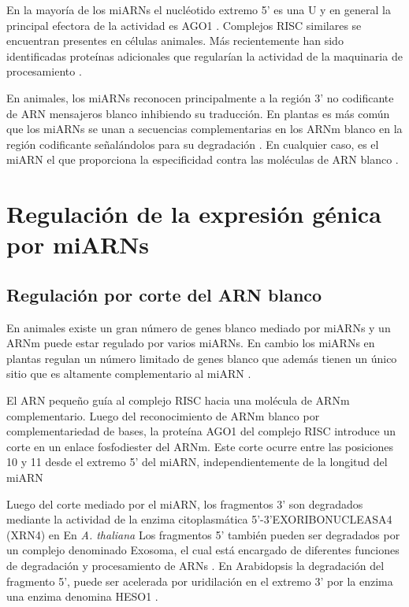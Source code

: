 En la mayoría de los miARNs el nucléotido extremo 5' es una U y en general la principal efectora de la actividad es AGO1 \citep{Voinnet2009669,pmid18342361,Vazquez2004a}.
Complejos RISC similares se encuentran presentes en células animales.
Más recientemente han sido identificadas proteínas adicionales que regularían la actividad de la maquinaria de procesamiento \citep{Bologna11112012}.

En animales, los miARNs reconocen principalmente a la región 3’ no codificante de ARN mensajeros blanco inhibiendo su traducción.
En plantas es más común que los miARNs se unan a secuencias complementarias en los ARNm blanco en la región codificante señalándolos para su degradación \citep{Jones-Rhoades2006}.
En cualquier caso, es el miARN el que proporciona la especificidad contra las moléculas de ARN blanco \citep{Bartel2004}.

\section{Regulación de la expresión génica por miARNs}

\subsection{Regulación por corte del ARN blanco}

En animales existe un gran número de genes blanco mediado por miARNs y un ARNm puede estar regulado por varios miARNs.
En cambio los miARNs en plantas regulan un número limitado de genes blanco que además tienen un único sitio que es altamente complementario al miARN \citep{Voinnet2009669}.

El ARN pequeño guía al complejo RISC hacia una molécula de ARNm complementario. 
Luego del reconocimiento de ARNm blanco por complementariedad de bases, la proteína AGO1 del complejo RISC introduce un corte en un enlace fosfodiester del ARNm.
Este corte ocurre entre las posiciones 10 y 11 desde el extremo 5' del miARN, independientemente de la longitud del miARN \citep{Mallory2004,Llave2002,pmid12931144,Xie2003,pmid15057819}

Luego del corte mediado por el miARN, los fragmentos 3' son degradados  mediante la actividad de la enzima citoplasmática 5’-3’EXORIBONUCLEASA4 (XRN4) en En \textit{A. thaliana}  \citep{pmid15260969}
Los fragmentos 5' también pueden ser degradados por un complejo denominado Exosoma, el cual está encargado de diferentes funciones de degradación y procesamiento de ARNs \citep{pmid18160042}.
En Arabidopsis la degradación del fragmento 5', puede ser acelerada por uridilación en el extremo 3' por la enzima una enzima denomina HESO1 \citep{pmid24733911}.

